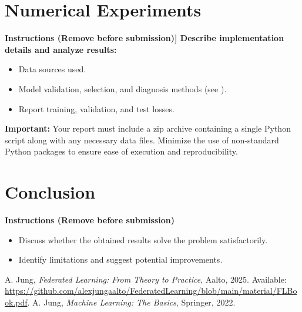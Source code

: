 \documentclass[9pt]{article}
\begin{document}
	\section{Numerical Experiments}
	\label{sec:experiments}
	{\bf Instructions (Remove before submission)]
		Describe implementation details and analyze results:
		\begin{itemize}
			\item Data sources used.
			\item Model validation, selection, and diagnosis methods (see \cite[Sec.~6.6]{Jung2022}).
			\item Report training, validation, and test losses.
		\end{itemize}}
	

\textbf{Important:} Your report must include a zip archive containing a single 
Python script along with any necessary data files. Minimize the use of non-standard 
Python packages to ensure ease of execution and reproducibility.

	
	\section{Conclusion}
	\label{sec:conclusion}
	{\bf Instructions (Remove before submission)
		\begin{itemize}
			\item Discuss whether the obtained results solve the problem satisfactorily.
			\item Identify limitations and suggest potential improvements.
		\end{itemize}}
	
	\begin{thebibliography}{9}
		 A. Jung, \textit{Federated Learning: From Theory to Practice}, Aalto, 2025. Available: \url{https://github.com/alexjungaalto/FederatedLearning/blob/main/material/FLBook.pdf}.
		 A. Jung, \textit{Machine Learning: The Basics}, Springer, 2022.
	\end{thebibliography}
	
\end{document}
